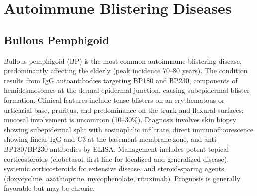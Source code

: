 \section{Autoimmune Blistering Diseases}








\label{sec:Autoimmune Blistering Diseases}

\subsection{Bullous Pemphigoid}
\label{sec:Bullous Pemphigoid}
Bullous pemphigoid (BP) is the most common autoimmune blistering disease, predominantly affecting the elderly (peak incidence 70--80 years). The condition results from IgG autoantibodies targeting BP180 and BP230, components of hemidesmosomes at the dermal-epidermal junction, causing subepidermal blister formation. Clinical features include tense blisters on an erythematous or urticarial base, pruritus, and predominance on the trunk and flexural surfaces; mucosal involvement is uncommon (10--30\%). Diagnosis involves skin biopsy showing subepidermal split with eosinophilic infiltrate, direct immunofluorescence showing linear IgG and C3 at the basement membrane zone, and anti-BP180/BP230 antibodies by ELISA. Management includes potent topical corticosteroids (clobetasol, first-line for localized and generalized disease), systemic corticosteroids for extensive disease, and steroid-sparing agents (doxycycline, azathioprine, mycophenolate, rituximab). Prognosis is generally favorable but may be chronic.

